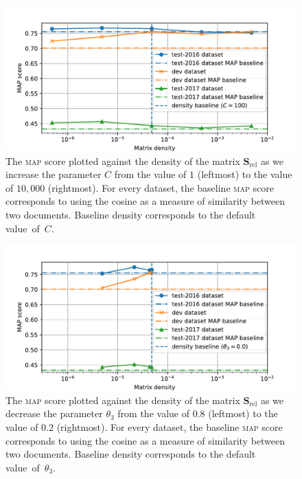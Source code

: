 \documentclass[
  digital, %
  notable, %
  lof,     %
  lot,     %
  nopalatino, color
]{fithesis3}
\def\abbr#1{\textsc{\MakeLowercase{#1}}}
\begin{document}
\begin{figure}[p]
\centering%
\includegraphics[trim={0.6cm 0.1cm 1.5cm 1.0cm}, scale=0.75]{figs/fig2}
\caption[A \abbr{MAP}-density plot for matrix $\mathbf S_{\textrm{rel}}$
and parameter $C$]{The \abbr{MAP}\index{map@\protect\abbr{MAP}}
  score plotted against the density of the matrix $\mathbf S_{\textrm{rel}}$
   as we increase the parameter $C$
   from the value of $1$ (leftmost) to the value of $10{,}000$
  (rightmost). For every dataset, the baseline \abbr{MAP} score
  corresponds to using the cosine as a measure of similarity between two
  documents. Baseline density corresponds to the default value~of~$C$.}
  \label{fig:similarity-fig2}
\end{figure}

\begin{figure}[p]
\centering%
\includegraphics[trim={0.6cm 0.1cm 1.5cm 1.0cm}, scale=0.75]{figs/fig3}
\caption[A \abbr{MAP}-density plot for matrix $\mathbf S_{\textrm{rel}}$
and parameter $\theta_3$]{The
  \abbr{MAP}\index{map@\protect\abbr{MAP}} score plotted against the density of
  the matrix $\mathbf S_{\textrm{rel}}$ 
  as we decrease the parameter $\theta_3$ from
  the value of $0.8$ (leftmost) to the value of $0.2$ (rightmost). For every
  dataset, the baseline \abbr{MAP} score corresponds to using the cosine as a measure
  of similarity between two documents. Baseline density corresponds to the
  default value~of~$\theta_3$.}
  \label{fig:similarity-fig3}
\end{figure}
\end{document}
